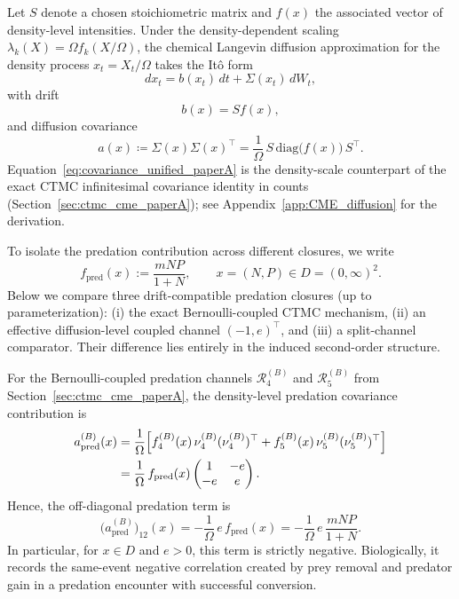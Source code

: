 \documentclass[pdflatex,sn-mathphys-ay]{sn-jnl}
\theoremstyle{thmstyleone}
\theoremstyle{definition}
\theoremstyle{remark}
\begin{document}
Let \(S\) denote a chosen stoichiometric matrix and \(f(x)\) the associated vector of density-level intensities. Under the density-dependent scaling \(\lambda_k(X)=\Omega f_k(X/\Omega)\), the chemical Langevin diffusion approximation for the density process \(x_t=X_t/\Omega\) takes the It\^o form
\begin{equation}
\label{eq:CLE_density_paperA}
dx_t = b(x_t)\,dt + \Sigma(x_t)\,dW_t,
\end{equation}
with drift
\begin{equation}
\label{eq:drift_unified_paperA}
b(x)=S f(x),
\end{equation}
and diffusion covariance
\begin{equation}
\label{eq:covariance_unified_paperA}
a(x)\coloneqq \Sigma(x)\Sigma(x)^\top
=
\frac{1}{\Omega}\,S\,\mathrm{diag}\!\bigl(f(x)\bigr)\,S^\top.
\end{equation}
Equation~\eqref{eq:covariance_unified_paperA} is the density-scale counterpart of the exact CTMC infinitesimal covariance identity in counts (Section~\ref{sec:ctmc_cme_paperA}); see Appendix~\ref{app:CME_diffusion} for the derivation.

To isolate the predation contribution across different closures, we write
\begin{equation}
\label{eq:fpred_paperA}
f_{\mathrm{pred}}(x):=\frac{mNP}{1+N},
\qquad x=(N,P)\in D=(0,\infty)^2.
\end{equation}
Below we compare three drift-compatible predation closures (up to parameterization): (i) the exact Bernoulli-coupled CTMC mechanism, (ii) an effective diffusion-level coupled channel \(({-1},e)^\top\), and (iii) a split-channel comparator. Their difference lies entirely in the induced second-order structure.

For the Bernoulli-coupled predation channels \(\mathcal R_4^{(B)}\) and \(\mathcal R_5^{(B)}\) from Section~\ref{sec:ctmc_cme_paperA}, the density-level predation covariance contribution is
\begin{align}
a_{\mathrm{pred}}^{(B)}(x)
&=
\frac{1}{\Omega}\Big[
f_4^{(B)}(x)\,\nu_4^{(B)}(\nu_4^{(B)})^\top
+
f_5^{(B)}(x)\,\nu_5^{(B)}(\nu_5^{(B)})^\top
\Big] \notag\\
&=
\frac{1}{\Omega}\,f_{\mathrm{pred}}(x)
\begin{pmatrix}
1 & -e\\
-e & e
\end{pmatrix}.
\label{eq:apred_B_paperA}
\end{align}
Hence, the off-diagonal predation term is
\begin{equation}
\label{eq:cross_B_negative_paperA}
\bigl(a_{\mathrm{pred}}^{(B)}\bigr)_{12}(x)
=
-\frac{1}{\Omega}\,e\,f_{\mathrm{pred}}(x)
=
-\frac{1}{\Omega}\,e\,\frac{mNP}{1+N}.
\end{equation}
In particular, for \(x\in D\) and \(e>0\), this term is strictly negative. Biologically, it records the same-event negative correlation created by prey removal and predator gain in a predation encounter with successful conversion.
\end{document}
